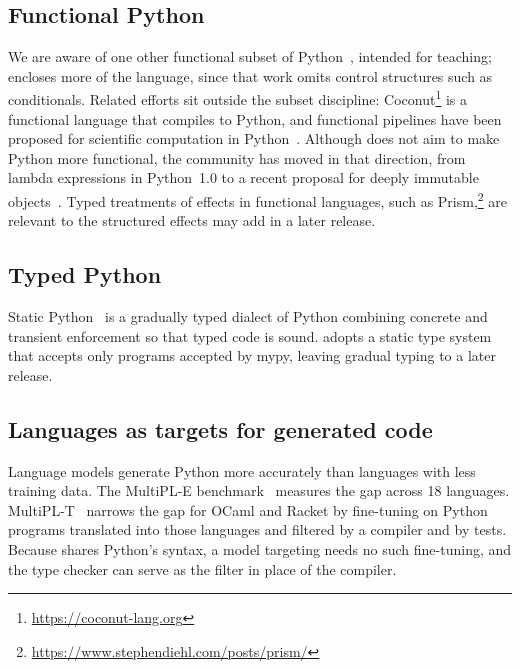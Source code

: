 \subsection{Functional Python}

We are aware of one other functional subset of Python~\citep{sunderraman2025}, intended for teaching; \PurePy
encloses more of the language, since that work omits control structures such as conditionals. Related efforts
sit outside the subset discipline: Coconut\footnote{\url{https://coconut-lang.org}} is a functional language that compiles to Python, and
functional pipelines have been proposed for scientific computation in Python~\citep{zhang2024}. Although \PurePy does not aim to make Python
more functional, the community has moved in that direction, from lambda expressions in Python~1.0 to a recent
proposal for deeply immutable objects~\citep{johnson2025}. Typed treatments of effects in functional languages,
such as Prism,\footnote{\url{https://www.stephendiehl.com/posts/prism/}} are relevant to the structured effects \PurePy may add in a later release.

\subsection{Typed Python}

Static Python~\citep{lu2023} is a gradually typed dialect of Python
combining concrete and transient enforcement so that typed code is sound. \PurePy adopts a static
type system that accepts only programs accepted by mypy, leaving gradual typing to a later release.

\subsection{Languages as targets for generated code}

Language models generate Python more accurately than languages with less training data. The MultiPL-E
benchmark~\citep{cassano2023} measures the gap across 18 languages. MultiPL-T~\citep{cassano2024} narrows the
gap for OCaml and Racket by fine-tuning on Python programs translated into those languages and filtered by a
compiler and by tests. Because \PurePy shares Python's syntax, a model targeting \PurePy needs no such
fine-tuning, and the \PurePy type checker can serve as the filter in place of the compiler.

